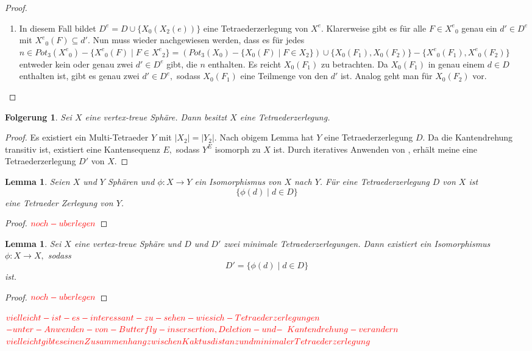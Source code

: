 \documentclass[12pt,titlepage,twoside,cleardoublepage]{article}
\theoremstyle{nummermitklammern}
\newtheorem{lemma}[temp]{Lemma}
\newtheorem{folgerung}[temp]{Folgerung}
\newtheorem{lemma}[zahl]{Lemma}
\newtheorem{folgerung}[zahl]{Folgerung}
\numberwithin{equation}{section}
\begin{document}
\begin{proof}
\begin{enumerate}
\item In diesem Fall bildet $D^e=D\cup\{X_0(X_2(e))\}$ eine Tetraederzerlegung von $X^e.$ Klarerweise gibt es für alle $F\in {X^e}_0$ genau ein $d'\in D^e$ mit ${X^e}_0(F)\subseteq d'.$ Nun muss wieder nachgewiesen werden, dass es für jedes $n\in Pot_3({X^e}_0)-\{{X^e}_0(F)\mid F\in {X^e}_2\}=(Pot_3({X}_0)-\{{X}_0(F)\mid F\in {X}_2\})\cup \{X_0(F_1),X_0(F_2)\}-\{{X^e}_0(F_1),{X^e}_0(F_2)\}$ entweder kein oder genau zwei $d'\in D^e$ gibt, die $n$ enthalten. Es reicht $X_0(F_1)$ zu betrachten. Da $X_0(F_1)$ in genau einem $d\in D$ enthalten ist, gibt es genau zwei $d'\in D^e,$ sodass $X_0(F_1)$ eine Teilmenge von den $d'$ ist. Analog geht man für $X_0(F_2) $ vor.
\end{enumerate}
\end{proof}
\begin{folgerung}
Sei $X$ eine vertex-treue Sphäre. Dann besitzt $X$ eine Tetraederzerlegung.
\end{folgerung}
\begin{proof}
Es existiert ein Multi-Tetraeder $Y$ mit $\vert X_2\vert =\vert Y_2 \vert .$ Nach obigem Lemma hat $Y$ eine Tetraederzerlegung $D$. Da die Kantendrehung transitiv ist, existiert eine Kantensequenz $E,$ sodass $Y^E$ isomorph zu $X$ ist. Durch iteratives Anwenden von , erhält meine eine Tetraederzerlegung $D'$ von $X$. 
\end{proof}
\begin{lemma}
Seien $X$ und $Y$ Sphären und $\phi:X\to Y$ ein Isomorphismus von $X$ nach $Y$. Für eine Tetraederzerlegung $D$ von $X$ ist \[
\{\phi(d)\mid d\in D\}
\] eine Tetraeder Zerlegung von $Y$.
\end{lemma}
\begin{proof}
$\textcolor{red}{noch-uberlegen}$
\end{proof}
\begin{lemma}
Sei $X$ eine vertex-treue Sphäre und $D$ und $D'$ zwei minimale Tetraederzerlegungen. Dann existiert ein Isomorphismus $\phi:X\to X,$ sodass
\[
D'=\{\phi(d)\mid d\in D\}
\]
ist.
\end{lemma}
\begin{proof}
$\textcolor{red}{noch-uberlegen}$
\end{proof}
$
\textcolor{red}{vielleicht-ist-es-interessant-zu-sehen-wie sich-Tetraederzerlegungen}$
$\textcolor{red}{-unter-Anwenden-von-Butterfly-insersertion,Deletion-und-}$ 
$\textcolor{red}{Kantendrehung-verandern}
$
$\textcolor{red}{vielleicht gibt es einen Zusammenhang zwischen Kaktusdistanz und minimaler Tetraederzerlegung}$
\end{document}
